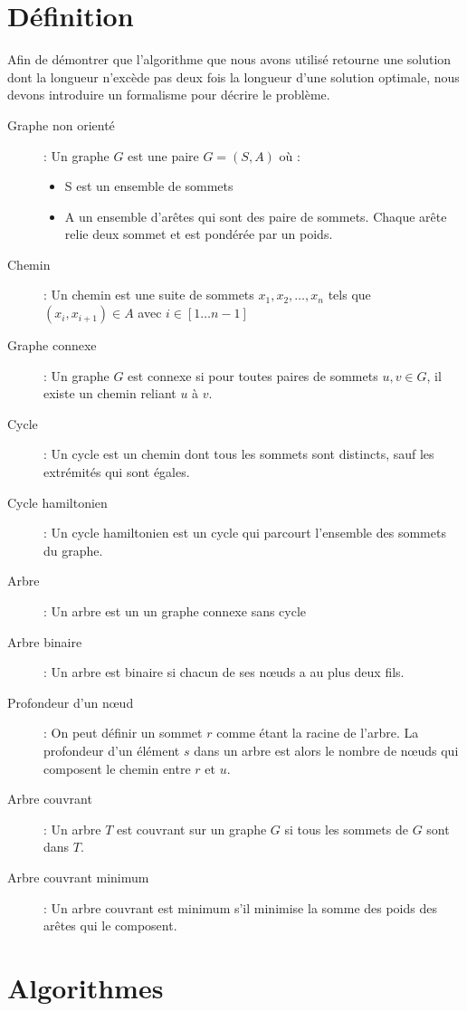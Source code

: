 \documentclass[a4paper,11pt]{article}
\begin{document}
\section{Définition} %
Afin de démontrer que l'algorithme que nous avons utilisé retourne une solution dont la longueur n'excède pas deux fois la longueur d'une solution optimale, nous devons introduire un formalisme pour décrire le problème.
\begin{description}
 \item[Graphe non orienté] : Un graphe $G$ est une paire $G = (S, A)$ où :
 \begin{itemize}
 \renewcommand{\FrenchLabelItem}{\textbullet}
  \item S est un ensemble de sommets
  \item A un ensemble d'arêtes qui sont des paire de sommets. Chaque arête relie deux sommet et est pondérée par un poids.
 \end{itemize}
 \item[Chemin] : Un chemin est une suite de sommets $x_1, x_2, \ldots, x_n$ tels que $\left(x_i, x_{i+1}\right) \in A$ avec $i \in \left[1\ldots n-1\right]$
 \item[Graphe connexe] : Un graphe $G$ est connexe si pour toutes paires de sommets $u, v \in G$, il existe un chemin reliant $u$ à $v$.
 \item[Cycle] : Un cycle est un chemin dont tous les sommets sont distincts, sauf les extrémités qui sont égales.
 \item[Cycle hamiltonien] : Un cycle hamiltonien est un cycle qui parcourt l'ensemble des sommets du graphe.
 \item[Arbre] : Un arbre est un un graphe connexe sans cycle
 \item[Arbre binaire] : Un arbre est binaire si chacun de ses nœuds a au plus deux fils.
 \item[Profondeur d'un nœud] : On peut définir un sommet $r$ comme étant la racine de l'arbre. La profondeur d'un élément $s$ dans un arbre est alors le nombre de nœuds qui composent le chemin entre $r$ et $u$.
 \item[Arbre couvrant] : Un arbre $T$ est couvrant sur un graphe $G$ si tous les sommets de $G$ sont dans $T$.
 \item[Arbre couvrant minimum] : Un arbre couvrant est minimum s'il minimise la somme des poids des arêtes qui le composent.
\end{description}

\section{Algorithmes}
\end{document}
